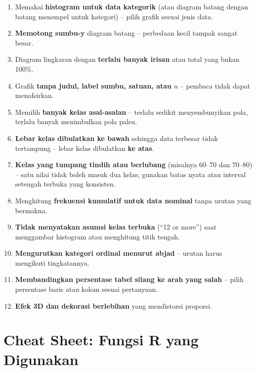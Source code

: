 \documentclass[
  indonesian,
  letterpaper,
]{book}
\providecommand{\tightlist}{%
  \setlength{\itemsep}{0pt}\setlength{\parskip}{0pt}}
\begin{document}
\begin{enumerate}
\def\labelenumi{\arabic{enumi}.}
\tightlist
\item
  Memakai \textbf{histogram untuk data kategorik} (atau diagram batang
  dengan batang menempel untuk kategori) -- pilih grafik sesuai jenis
  data.
\item
  \textbf{Memotong sumbu-y} diagram batang -- perbedaan kecil tampak
  sangat besar.
\item
  Diagram lingkaran dengan \textbf{terlalu banyak irisan} atau total
  yang bukan 100\%.
\item
  Grafik \textbf{tanpa judul, label sumbu, satuan, atau} \(n\) --
  pembaca tidak dapat menafsirkan.
\item
  Memilih \textbf{banyak kelas asal-asalan} -- terlalu sedikit
  menyembunyikan pola, terlalu banyak menimbulkan pola palsu.
\item
  \textbf{Lebar kelas dibulatkan ke bawah} sehingga data terbesar tidak
  tertampung -- lebar kelas dibulatkan \textbf{ke atas}.
\item
  \textbf{Kelas yang tumpang tindih atau berlubang} (misalnya 60--70 dan
  70--80) -- satu nilai tidak boleh masuk dua kelas; gunakan batas nyata
  atau interval setengah terbuka yang konsisten.
\item
  Menghitung \textbf{frekuensi kumulatif untuk data nominal} tanpa
  urutan yang bermakna.
\item
  \textbf{Tidak menyatakan asumsi kelas terbuka} (``12 or more'') saat
  menggambar histogram atau menghitung titik tengah.
\item
  \textbf{Mengurutkan kategori ordinal menurut abjad} -- urutan harus
  mengikuti tingkatannya.
\item
  \textbf{Membandingkan persentase tabel silang ke arah yang salah} --
  pilih persentase baris atau kolom sesuai pertanyaan.
\item
  \textbf{Efek 3D dan dekorasi berlebihan} yang mendistorsi proporsi.
\end{enumerate}

\section{Cheat Sheet: Fungsi R yang
Digunakan}\label{cheat-sheet-fungsi-r-yang-digunakan-3}
\end{document}
